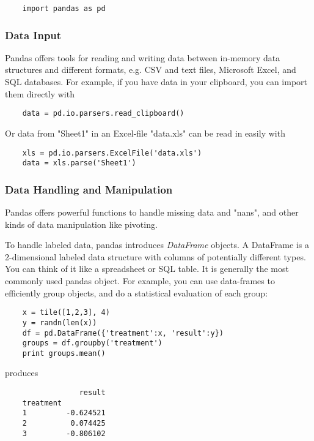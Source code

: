 \begin{lstlisting}
    import pandas as pd
\end{lstlisting}


\subsubsection{Data Input}
Pandas offers tools for reading and writing data between in-memory data structures and different
formats, e.g. CSV and text files, Microsoft Excel, and SQL databases. For example, if you have data
in your clipboard, you can import them directly with

\begin{lstlisting}
    data = pd.io.parsers.read_clipboard()
\end{lstlisting}

Or data from "Sheet1" in an Excel-file "data.xls" can be read in easily with

\begin{lstlisting}
    xls = pd.io.parsers.ExcelFile('data.xls')
    data = xls.parse('Sheet1')
\end{lstlisting}


\subsubsection{Data Handling and Manipulation}
Pandas offers powerful functions to handle missing data and "nans", and other kinds of data manipulation like pivoting.

To handle labeled data, pandas introduces \emph{DataFrame} objects. A DataFrame is a 2-dimensional labeled data structure with columns of potentially different types. You can think of it like a spreadsheet or SQL table. It is generally the most commonly used pandas object. For example, you can use data-frames to efficiently group objects, and do a statistical evaluation of each group:

\begin{lstlisting}
    x = tile([1,2,3], 4)
    y = randn(len(x))
    df = pd.DataFrame({'treatment':x, 'result':y})
    groups = df.groupby('treatment')
    print groups.mean()
\end{lstlisting}

produces

\begin{lstlisting}
                 result
    treatment
    1         -0.624521
    2          0.074425
    3         -0.806102
\end{lstlisting}

